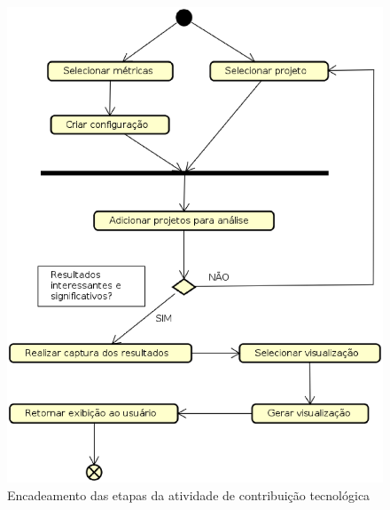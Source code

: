 \begin{figure}[h]
  \centering
    \includegraphics[keepaspectratio=true,scale=0.5]
    {figuras/metodotologia_atividades.eps}
  \caption{Encadeamento das etapas da atividade de contribuição tecnológica}
  \label{fig:metodotologia_atividades}
\end{figure}

